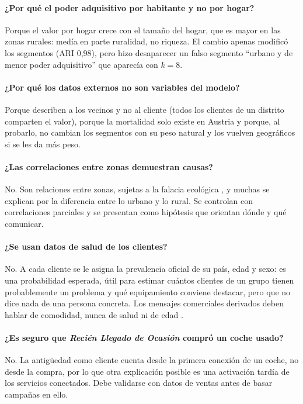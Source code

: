 \documentclass[11pt,a4paper]{article}
\newcommand{\seg}[1]{\textit{#1}}
\begin{document}
\paragraph{¿Por qué el poder adquisitivo por habitante y no por hogar?} Porque el valor por hogar crece con el tamaño
del hogar, que es mayor en las zonas rurales: medía en parte ruralidad, no riqueza. El cambio apenas modificó los
segmentos (ARI 0,98), pero hizo desaparecer un falso segmento \enquote{urbano y de menor poder adquisitivo} que aparecía
con $k=8$.

\paragraph{¿Por qué los datos externos no son variables del modelo?} Porque describen a los vecinos y no al cliente
(todos los clientes de un distrito comparten el valor), porque la mortalidad solo existe en Austria y porque, al
probarlo, no cambian los segmentos con su peso natural y los vuelven geográficos si se les da más peso.

\paragraph{¿Las correlaciones entre zonas demuestran causas?} No. Son relaciones entre zonas, sujetas a la falacia
ecológica \parencite{robinson1950}, y muchas se explican por la diferencia entre lo urbano y lo rural. Se controlan con
correlaciones parciales y se presentan como hipótesis que orientan dónde y qué comunicar.

\paragraph{¿Se usan datos de salud de los clientes?} No. A cada cliente se le asigna la prevalencia oficial de su país,
edad y sexo: es una probabilidad esperada, útil para estimar cuántos clientes de un grupo tienen probablemente un
problema y qué equipamiento conviene destacar, pero que no dice nada de una persona concreta. Los mensajes comerciales
derivados deben hablar de comodidad, nunca de salud ni de edad \parencite{rgpd2016}.

\paragraph{¿Es seguro que \seg{Recién Llegado de Ocasión} compró un coche usado?} No. La antigüedad como cliente cuenta
desde la primera conexión de un coche, no desde la compra, por lo que otra explicación posible es una activación tardía
de los servicios conectados. Debe validarse con datos de ventas antes de basar campañas en ello.
\end{document}
